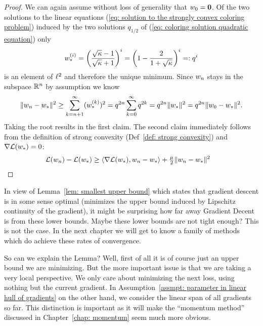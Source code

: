 \begin{proof}
	We can again assume without loss of generality that \(w_0=\mathbf{0}\).
	Of the two solutions to the linear equations (\ref{eq: solution to the
	strongly convex coloring problem}) induced by the two solutions \(q_{1/2}\)
	of (\ref{eq: coloring solution quadratic equation}) only
	\begin{align*}
		w_*^{(i)} = \left(\frac{\sqrt{\kappa}-1}{\sqrt{\kappa}+1}\right)^i
		= \left(1 - \frac{2}{1+\sqrt{\kappa}}\right)^i =: q^i
	\end{align*}
	is an element of \(\ell^{2}\) and therefore the unique minimum. Since 
	\(w_n\) stays in the subspace \(\mathbb{R}^n\) by assumption we know
	\begin{align*}
		\|w_n -w_*\|^2
		\ge \sum_{k=n+1}^\infty (w_*^{(k)})^2
		= q^{2n} \sum_{k=0}^\infty q^{2k}
		= q^{2n} \| w_*\|^2
		= q^{2n} \|w_0 - w_*\|^2.
	\end{align*}
	Taking the root results in the first claim. The second claim immediately
	follows from the definition of strong convexity (Def~\ref{def: strong convexity})
	and \(\nabla\mathcal{L}(w_*) = 0\):
	\begin{align*}
		\mathcal{L}(w_n) - \mathcal{L}(w_*)
		&\ge \langle \nabla\mathcal{L}(w_*), w_n -w_*\rangle
		+\tfrac{\mu}{2} \|w_n -w_*\|^2
		\qedhere
	\end{align*}
\end{proof}

In view of Lemma~\ref{lem: smallest upper bound} which states that gradient
descent is in some sense optimal (minimizes the upper bound induced by
Lipschitz continuity of the gradient), it might be surprising how far away
Gradient Decent is from these lower bounds. Maybe these lower bounds are not
tight enough? This is not the case. In the next chapter we will get to know
a family of methods which do achieve these rates of convergence.

So can we
explain the Lemma? Well, first of all it is of course just an upper bound we
are minimizing. But the more important issue is that we are taking a very
local perspective. We only care about minimizing the next loss, using 
nothing but the current gradient. In Assumption~\ref{assmpt: parameter in
linear hull of gradients} on the other hand, we consider the linear span of all
gradients so far. This distinction is important as it will make the
``momentum method'' discussed in Chapter~\ref{chap: momentum} seem much more obvious.

